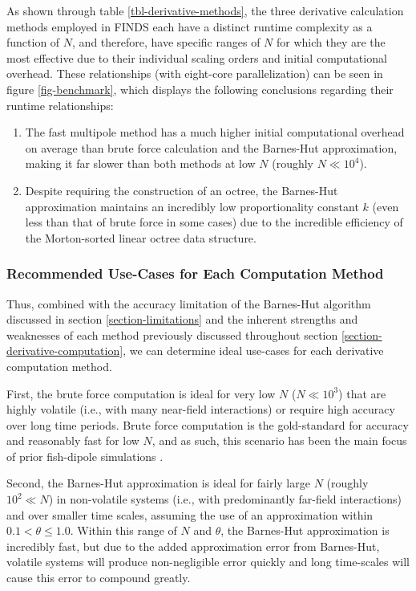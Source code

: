 \documentclass[letterpaper, 10pt, twoside]{LTJournalArticle}
\begin{document}
As shown through table \ref{tbl-derivative-methods}, the three derivative
calculation methods employed in FINDS each have a distinct runtime complexity
as a function of $N$, and therefore, have specific ranges of $N$ for which they
are the most effective due to their individual scaling orders and
initial computational overhead. These relationships (with eight-core parallelization)
can be seen in figure \ref{fig-benchmark}, which displays the following
conclusions regarding their runtime relationships:
\begin{enumerate}
\item The fast multipole method has a much higher initial computational overhead
  on average than brute force calculation and the Barnes-Hut approximation,
  making it far slower than both methods at low $N$ (roughly $N \ll 10^4$).
\item Despite requiring the construction of an octree, the Barnes-Hut
  approximation maintains an incredibly low proportionality constant $k$ (even
  less than that of brute force in some cases) due to the incredible efficiency
  of the Morton-sorted linear octree data structure.
\end{enumerate}

\subsubsection{Recommended Use-Cases for Each Computation Method}

Thus, combined with the accuracy limitation of the Barnes-Hut algorithm
discussed in section \ref{section-limitations} and the inherent strengths and
weaknesses of each method previously discussed throughout section
\ref{section-derivative-computation}, we can determine ideal use-cases for each
derivative computation method.

First, the brute force computation is ideal for very low $N$ ($N \ll 10^3$) that
are highly volatile (i.e., with many near-field interactions) or require high
accuracy over long time periods. Brute force computation is the gold-standard
for accuracy and reasonably fast for low $N$, and as such, this scenario has
been the main focus of prior fish-dipole simulations
\cite{mabrouk_floryan_2024, mabrouk_floryan_2025, tchieu_et_al_2012}.

Second, the Barnes-Hut approximation is ideal for fairly large $N$ (roughly
$10^2 \ll N$) in non-volatile systems (i.e., with predominantly far-field
interactions) and over smaller time scales, assuming the use of an approximation
within $0.1 < \theta \le 1.0$. Within this range of $N$ and $\theta$, the
Barnes-Hut approximation is incredibly fast, but due to the added approximation
error from Barnes-Hut, volatile systems will produce non-negligible error
quickly and long time-scales will cause this error to compound greatly.
\end{document}

